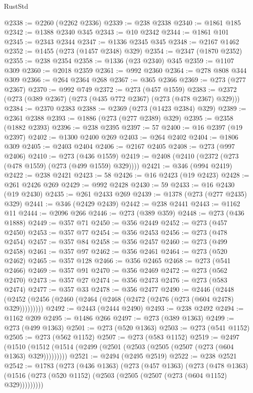 \begin{lexlean}{RustStd}
\begin{coremodule}
{{{{{{{{{{{{{{{{{{{@2338 := @2260 (@2262 @2336)
@2339 := @238 @2338
@2340 := @1861 @185
@2342 := @1388 @2340 @345
@2343 := @10 @2342
@2344 := @1861 @101
@2345 := @2343 @2344
@2347 := @1336 @2345 @345
@2348 := @2167 @1462
@2352 := @1455 (@273 (@1457 @2348) @329)
@2354 := @2347 (@1870 @2352)
@2355 := @238 @2354
@2358 := @1336 (@23 @2340) @345
@2359 := @1107 @309
@2360 := @2018 @2359
@2361 := @992 @2360
@2364 := @278 @808 @344 @309
@2366 := @264 @2364 @268
@2367 := @365 @2366
@2369 := @273 (@277 @2367)
@2370 := @992 @749
@2372 := @273 (@457 @1559)
@2383 := @2372 (@273 (@389 @2367) (@273 (@435 @772 @2367) (@273 (@478 @2367) @329)))
@2384 := @2370 @2383
@2388 := @2369 (@273 (@1423 @2384) @329)
@2389 := @2361 @2388
@2393 := @1886 (@273 (@277 @2389) @329)
@2395 := @2358 (@1882 @2393)
@2396 := @238 @2395
@2397 := 57
@2400 := @16 @2397 (@19 @2397)
@2402 := @1300 @2400 @269
@2403 := @264 @2402
@2404 := @1806 @309
@2405 := @2403 @2404
@2406 := @2167 @2405
@2408 := @273 (@997 @2406)
@2410 := @273 (@436 @1559)
@2419 := @2408 (@2410 (@2372 (@273 (@478 @1559) (@273 (@499 @1559) @329))))
@2421 := @346 (@994 @2419)
@2422 := @238 @2421
@2423 := 58
@2426 := @16 @2423 (@19 @2423)
@2428 := @261 @2426 @269
@2429 := @992 @2428
@2430 := 59
@2433 := @16 @2430 (@19 @2430)
@2435 := @261 @2433 @269
@2439 := @1378 (@273 (@277 @2435) @329)
@2441 := @346 (@2429 @2439)
@2442 := @238 @2441
@2443 := @1162 @11
@2444 := @2096 @266
@2446 := @273 (@389 @359)
@2448 := @273 (@436 @1888)
@2449 := @357 @71
@2450 := @356 @2449
@2452 := @273 (@457 @2450)
@2453 := @357 @77
@2454 := @356 @2453
@2456 := @273 (@478 @2454)
@2457 := @357 @84
@2458 := @356 @2457
@2460 := @273 (@499 @2458)
@2461 := @357 @97
@2462 := @356 @2461
@2464 := @273 (@520 @2462)
@2465 := @357 @128
@2466 := @356 @2465
@2468 := @273 (@541 @2466)
@2469 := @357 @91
@2470 := @356 @2469
@2472 := @273 (@562 @2470)
@2473 := @357 @27
@2474 := @356 @2473
@2476 := @273 (@583 @2474)
@2477 := @357 @33
@2478 := @356 @2477
@2490 := @2446
    (@2448 (@2452 (@2456 (@2460 (@2464 (@2468 (@2472 (@2476 (@273 (@604 @2478) @329)))))))))
@2492 := @2443 (@2444 @2490)
@2493 := @238 @2492
@2494 := @1162 @209
@2495 := @1486 @266
@2497 := @273 (@389 @1363)
@2499 := @273 (@499 @1363)
@2501 := @273 (@520 @1363)
@2503 := @273 (@541 @1152)
@2505 := @273 (@562 @1152)
@2507 := @273 (@583 @1152)
@2519 := @2497
    (@1510 (@1512 (@1514 (@2499 (@2501 (@2503 (@2505 (@2507 (@273 (@604 @1363) @329)))))))))
@2521 := @2494 (@2495 @2519)
@2522 := @238 @2521
@2542 := @1783
    (@273
      (@436 @1363)
      (@273
        (@457 @1363)
        (@273
          (@478 @1363)
          (@1516 (@273 (@520 @1152) (@2503 (@2505 (@2507 (@273 (@604 @1152) @329)))))))))
}}}}}}}}}}}}}}}}}}}
\end{coremodule}
\end{lexlean}
